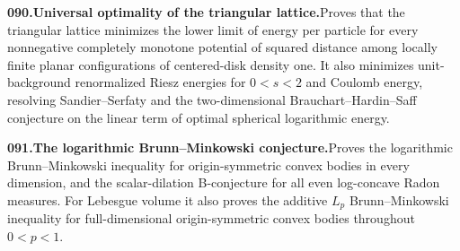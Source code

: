 \documentclass[11pt,a4paper]{article}
\begin{document}
  \par \begin{minipage}{\linewidth}
  \fontsize{10.5}{12.6}\selectfont\RaggedRight
  \hypertarget{result 090}{}
  {\bfseries\textcolor{muted}{090.}\enspace Universal optimality of the triangular lattice.}\enspace Proves that the triangular lattice minimizes the lower limit of energy per particle for every nonnegative completely monotone potential of squared distance among locally finite planar configurations of centered-disk density one. It also minimizes unit-background renormalized Riesz energies for $0<s<2$ and Coulomb energy, resolving Sandier--Serfaty and the two-dimensional Brauchart--Hardin--Saff conjecture on the linear term of optimal spherical logarithmic energy.\par
  \end{minipage}\par\vspace{5pt}



  \par \begin{minipage}{\linewidth}
  \fontsize{10.5}{12.6}\selectfont\RaggedRight
  \hypertarget{result 091}{}
  {\bfseries\textcolor{muted}{091.}\enspace The logarithmic Brunn--Minkowski conjecture.}\enspace Proves the logarithmic Brunn--Minkowski inequality for origin-symmetric convex bodies in every dimension, and the scalar-dilation B-conjecture for all even log-concave Radon measures. For Lebesgue volume it also proves the additive $L_p$ Brunn--Minkowski inequality for full-dimensional origin-symmetric convex bodies throughout $0<p<1$.\par
  \end{minipage}\par\vspace{5pt}
\end{document}
